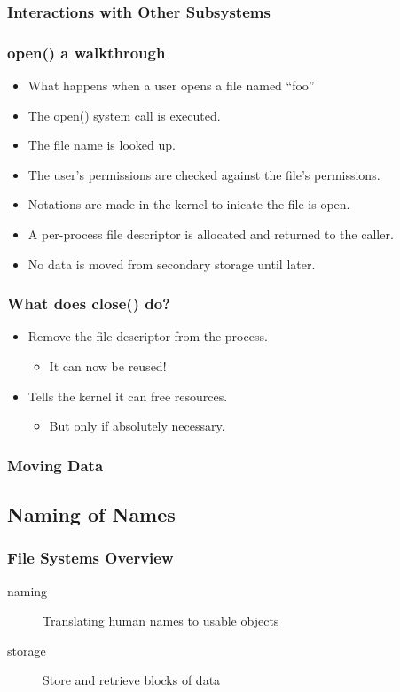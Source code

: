 \documentclass[pdftex]{beamer} %
\begin{document}
\begin{frame}
  \frametitle{Interactions with Other Subsystems}
  
\end{frame}

\begin{frame}
  \frametitle{open() a walkthrough}
  \begin{itemize}
  \item What happens when a user opens a file named ``foo''
  \item The open() system call is executed.
  \item The file name is looked up.
  \item The user's permissions are checked against the file's
    permissions.
  \item Notations are made in the kernel to inicate the file is open.
  \item A per-process file descriptor is allocated and returned to the
    caller.
  \item No data is moved from secondary storage until later.
  \end{itemize}
\end{frame}

\begin{frame}
  \frametitle{What does close() do?}
  \begin{itemize}
  \item Remove the file descriptor from the process.
    \begin{itemize}
    \item It can now be reused!
    \end{itemize}
  \item Tells the kernel it can free resources.
    \begin{itemize}
    \item But only if absolutely necessary.
    \end{itemize}
  \end{itemize}
\end{frame}

\begin{frame}
  \frametitle{Moving Data}
  
\end{frame}

\subsection{Naming of Names}
\label{sec:naming}

\begin{frame}
  \frametitle{File Systems Overview}
  \begin{description}
  \item[naming] Translating human names to usable objects
  \item[storage] Store and retrieve blocks of data
  \end{description}
\end{frame}
\end{document}
